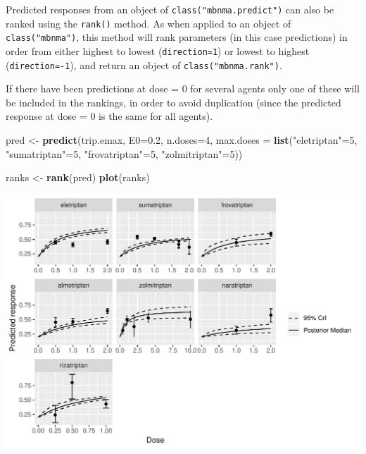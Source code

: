 \documentclass[]{article}
\newenvironment{Shaded}{\begin{snugshade}}{\end{snugshade}}
\newcommand{\DataTypeTok}[1]{\textcolor[rgb]{0.13,0.29,0.53}{#1}}
\newcommand{\DecValTok}[1]{\textcolor[rgb]{0.00,0.00,0.81}{#1}}
\newcommand{\FloatTok}[1]{\textcolor[rgb]{0.00,0.00,0.81}{#1}}
\newcommand{\KeywordTok}[1]{\textcolor[rgb]{0.13,0.29,0.53}{\textbf{#1}}}
\newcommand{\NormalTok}[1]{#1}
\newcommand{\StringTok}[1]{\textcolor[rgb]{0.31,0.60,0.02}{#1}}
\begin{document}
Predicted responses from an object of \texttt{class("mbnma.predict")}
can also be ranked using the \texttt{rank()} method. As when applied to
an object of \texttt{class("mbnma")}, this method will rank parameters
(in this case predictions) in order from either highest to lowest
(\texttt{direction=1}) or lowest to highest (\texttt{direction=-1}), and
return an object of \texttt{class("mbnma.rank")}.

If there have been predictions at dose = 0 for several agents only one
of these will be included in the rankings, in order to avoid duplication
(since the predicted response at dose = 0 is the same for all agents).

\begin{Shaded}
\begin{Highlighting}[]
\NormalTok{pred <-}\StringTok{ }\KeywordTok{predict}\NormalTok{(trip.emax, }\DataTypeTok{E0=}\FloatTok{0.2}\NormalTok{, }\DataTypeTok{n.doses=}\DecValTok{4}\NormalTok{,}
                \DataTypeTok{max.doses =} \KeywordTok{list}\NormalTok{(}\StringTok{"eletriptan"}\NormalTok{=}\DecValTok{5}\NormalTok{, }\StringTok{"sumatriptan"}\NormalTok{=}\DecValTok{5}\NormalTok{, }
                              \StringTok{"frovatriptan"}\NormalTok{=}\DecValTok{5}\NormalTok{, }\StringTok{"zolmitriptan"}\NormalTok{=}\DecValTok{5}\NormalTok{))}

\NormalTok{ranks <-}\StringTok{ }\KeywordTok{rank}\NormalTok{(pred)}
\KeywordTok{plot}\NormalTok{(ranks)}
\end{Highlighting}
\end{Shaded}

\includegraphics{mbnmadose_files/figure-latex/unnamed-chunk-47-1.pdf}
\end{document}
